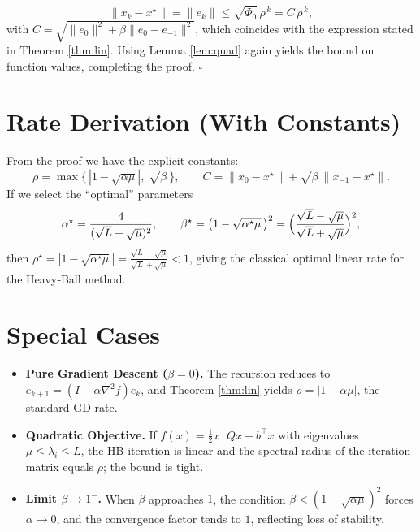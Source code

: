 \documentclass{article}
\begin{document}
\[
\|x_{k}-x^{\star}\|=\|e_{k}\|\le \sqrt{\Phi_{0}}\,\rho^{\,k}
= C\,\rho^{\,k},
\]
with $C=\sqrt{\|e_{0}\|^{2}+\beta\|e_{0}-e_{-1}\|^{2}}$, which coincides with the expression stated in Theorem \ref{thm:lin}.  
Using Lemma \ref{lem:quad} again yields the bound on function values, completing the proof. \hfill $\square$

\section*{Rate Derivation (With Constants)}
From the proof we have the explicit constants:
\[
\rho = \max\{\,|1-\sqrt{\alpha\mu}|,\;\sqrt{\beta}\,\},
\qquad
C = \|x_{0}-x^{\star}\|+\sqrt{\beta}\,\|x_{-1}-x^{\star}\|.
\]
If we select the “optimal” parameters
\[
\alpha^{\star}= \frac{4}{(\sqrt{L}+\sqrt{\mu})^{2}},\qquad
\beta^{\star}= \bigl(1-\sqrt{\alpha^{\star}\mu}\,\bigr)^{2}
           =\Bigl(\frac{\sqrt{L}-\sqrt{\mu}}{\sqrt{L}+\sqrt{\mu}}\Bigr)^{2},
\]
then $\rho^{\star}=|1-\sqrt{\alpha^{\star}\mu}| = \frac{\sqrt{L}-\sqrt{\mu}}{\sqrt{L}+\sqrt{\mu}}<1$, giving the classical optimal linear rate for the Heavy‑Ball method.

\section*{Special Cases}
\begin{itemize}
\item \textbf{Pure Gradient Descent ($\beta=0$).}  
The recursion reduces to $e_{k+1}=(I-\alpha\nabla^{2}f) e_{k}$, and Theorem \ref{thm:lin} yields $\rho=|1-\alpha\mu|$, the standard GD rate.
\item \textbf{Quadratic Objective.}  
If $f(x)=\frac12 x^{\top}Qx-b^{\top}x$ with eigenvalues $\mu\le\lambda_i\le L$, the HB iteration is linear and the spectral radius of the iteration matrix equals $\rho$; the bound is tight.
\item \textbf{Limit $\beta\to 1^{-}$.}  
When $\beta$ approaches $1$, the condition $\beta<(1-\sqrt{\alpha\mu})^{2}$ forces $\alpha\to 0$, and the convergence factor tends to $1$, reflecting loss of stability.
\end{itemize}
\end{document}

